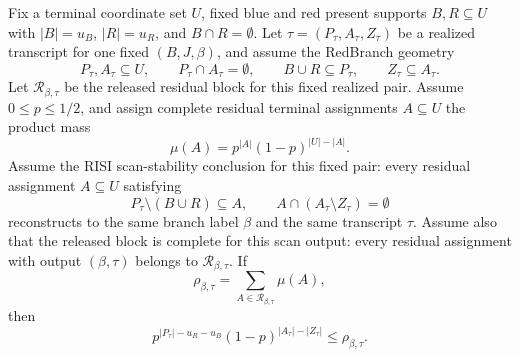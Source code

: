 \begin{helper}
Fix a terminal coordinate set \(U\), fixed blue and red present supports
\(B,R\subseteq U\) with \(|B|=u_B\), \(|R|=u_R\), and \(B\cap R=\emptyset\).
Let \(\tau=(P_\tau,A_\tau,Z_\tau)\) be a realized transcript for one fixed
\((B,J,\beta)\), and assume the RedBranch geometry
\[
P_\tau,A_\tau\subseteq U,\qquad P_\tau\cap A_\tau=\emptyset,\qquad
B\cup R\subseteq P_\tau,\qquad Z_\tau\subseteq A_\tau .
\]
Let \(\mathcal R_{\beta,\tau}\) be the released residual block for this
fixed realized pair.  Assume \(0\le p\le 1/2\), and assign complete residual
terminal assignments \(A\subseteq U\) the product mass
\[
\mu(A)=p^{|A|}(1-p)^{|U|-|A|}.
\]
Assume the RISI scan-stability conclusion for this fixed pair: every
residual assignment \(A\subseteq U\) satisfying
\[
P_\tau\setminus(B\cup R)\subseteq A,\qquad
A\cap(A_\tau\setminus Z_\tau)=\emptyset
\]
reconstructs to the same branch label \(\beta\) and the same transcript
\(\tau\).  Assume also that the released block is complete for this scan
output: every residual assignment with output \((\beta,\tau)\) belongs to
\(\mathcal R_{\beta,\tau}\).  If
\[
\rho_{\beta,\tau}
  =\sum_{A\in\mathcal R_{\beta,\tau}}\mu(A),
\]
then
\[
p^{|P_\tau|-u_R-u_B}(1-p)^{|A_\tau|-|Z_\tau|}
  \le \rho_{\beta,\tau}.
\]
\end{helper}
